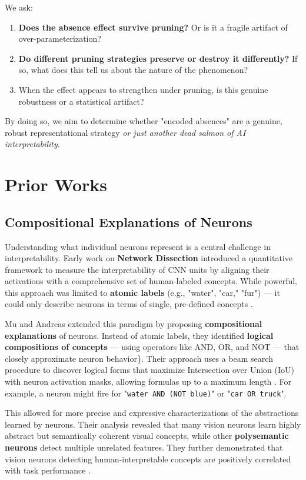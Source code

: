 We ask:

\begin{enumerate}
\item \textbf{Does the absence effect survive pruning?} Or is it a fragile artifact of over-parameterization?
\item \textbf{Do different pruning strategies preserve or destroy it differently?} If so, what does this tell us about the nature of the phenomenon?
\item When the effect appears to strengthen under pruning, is this genuine robustness or a statistical artifact?
\end{enumerate}

By doing so, we aim to determine whether "encoded absences" are a genuine, robust representational strategy \textit{or just another dead salmon of AI interpretability}.

\section{\textbf{Prior Works}}

\subsection{\textbf{Compositional Explanations of Neurons}}

Understanding what individual neurons represent is a central challenge in interpretability. Early work on \textbf{Network Dissection} introduced a quantitative framework to measure the interpretability of CNN units by aligning their activations with a comprehensive set of human-labeled concepts. While powerful, this approach was limited to \textbf{atomic labels} (e.g., "water", "car," "fur") — it could only describe neurons in terms of single, pre-defined concepts \cite{netdissec}.

Mu and Andreas extended this paradigm by proposing \textbf{compositional explanations} of neurons. Instead of atomic labels, they identified \textbf{logical compositions of concepts} — using operators like AND, OR, and NOT — that closely approximate neuron behavior\}. Their approach uses a beam search procedure to discover logical forms that maximize Intersection over Union (IoU) with neuron activation masks, allowing formulas up to a maximum length \cite{compex}. For example, a neuron might fire for "\texttt{water AND (NOT blue)}" or "\texttt{car OR truck}".


This allowed for more precise and expressive characterizations of the abstractions learned by neurons. Their analysis revealed that many vision neurons learn highly abstract but semantically coherent visual 
concepts, while other
 \textbf{polysemantic neurons} detect multiple unrelated features. They further demonstrated that vision neurons detecting human-interpretable concepts are positively correlated with task performance \cite{compex}.

